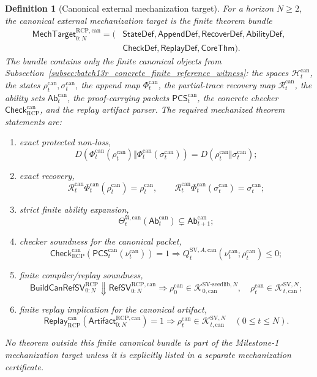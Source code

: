 \documentclass[11pt]{article}
\newtheorem{definition}[theorem]{Definition}
\newcommand{\Hcal}{\mathcal{H}}
\newcommand{\1}{\mathbf{1}}
\newcommand{\RCP}{\mathrm{RCP}}
\providecommand{\Kcal}{\mathcal{K}}
\begin{document}
\begin{definition}[Canonical external mechanization target]
\label{def:batch13rb_canonical_external_mechanization_target}
For a horizon \(N\ge2\), the canonical external mechanization target is the finite theorem bundle
\[
\begin{aligned}
\mathsf{MechTarget}_{0:N}^{\RCP,\mathrm{can}}
=(&\mathsf{StateDef},\mathsf{AppendDef},\mathsf{RecoverDef},\mathsf{AbilityDef},\\
&\mathsf{CheckDef},\mathsf{ReplayDef},\mathsf{CoreThm}).
\end{aligned}
\]
The bundle contains only the finite canonical objects from Subsection~\ref{subsec:batch13r_concrete_finite_reference_witness}: the spaces \(\Hcal_t^{\mathrm{can}}\), the states \(\rho_t^{\mathrm{can}},\sigma_t^{\mathrm{can}}\), the append map \(\Phi_t^{\mathrm{can}}\), the partial-trace recovery map \(\mathcal R_t^{\mathrm{can}}\), the ability sets \(\mathsf{Ab}_t^{\mathrm{can}}\), the proof-carrying packets \(\mathsf{PCS}_t^{\mathrm{can}}\), the concrete checker \(\mathsf{Check}_{\RCP}^{\mathrm{can}}\), and the replay artifact parser.  The required mechanized theorem statements are:
\begin{enumerate}[label=(\roman*),leftmargin=1.5em]
    \item exact protected non-loss,
    \[
    D(\Phi_t^{\mathrm{can}}(\rho_t^{\mathrm{can}})\Vert
      \Phi_t^{\mathrm{can}}(\sigma_t^{\mathrm{can}}))
    =D(\rho_t^{\mathrm{can}}\Vert\sigma_t^{\mathrm{can}});
    \]
    \item exact recovery,
    \[
    \mathcal R_t^{\mathrm{can}}\Phi_t^{\mathrm{can}}(\rho_t^{\mathrm{can}})=\rho_t^{\mathrm{can}},
    \qquad
    \mathcal R_t^{\mathrm{can}}\Phi_t^{\mathrm{can}}(\sigma_t^{\mathrm{can}})=\sigma_t^{\mathrm{can}};
    \]
    \item strict finite ability expansion,
    \[
    \Theta_t^{\mathfrak A,\mathrm{can}}(\mathsf{Ab}_t^{\mathrm{can}})
    \subsetneq
    \mathsf{Ab}_{t+1}^{\mathrm{can}};
    \]
    \item checker soundness for the canonical packet,
    \[
    \mathsf{Check}_{\RCP}^{\mathrm{can}}
    (\mathsf{PCS}_t^{\mathrm{can}}(\nu_t^{\mathrm{can}}))=1
    \Longrightarrow
    Q_t^{\mathrm{SV},A,\mathrm{can}}(\nu_t^{\mathrm{can}};\rho_t^{\mathrm{can}})\le0;
    \]
    \item finite compiler/replay soundness,
    \[
    \mathsf{BuildCanRefSV}_{0:N}^{\RCP}\Downarrow
    \mathsf{RefSV}_{0:N}^{\RCP,\mathrm{can}}
    \Longrightarrow
    \rho_0^{\mathrm{can}}\in\Kcal_{0,\mathrm{can}}^{\mathrm{SV\mbox{-}seedlib},N},
    \quad
    \rho_t^{\mathrm{can}}\in\Kcal_{t,\mathrm{can}}^{\mathrm{SV},N};
    \]
    \item finite replay implication for the canonical artifact,
    \[
    \mathsf{Replay}_{\RCP}^{\mathrm{can}}
    (\mathsf{Artifact}_{0:N}^{\RCP,\mathrm{can}})=1
    \Longrightarrow
    \rho_t^{\mathrm{can}}\in\Kcal_{t,\mathrm{can}}^{\mathrm{SV},N}
    \quad (0\le t\le N).
    \]
\end{enumerate}
No theorem outside this finite canonical bundle is part of the Milestone-1 mechanization target unless it is explicitly listed in a separate mechanization certificate.
\end{definition}
\end{document}
